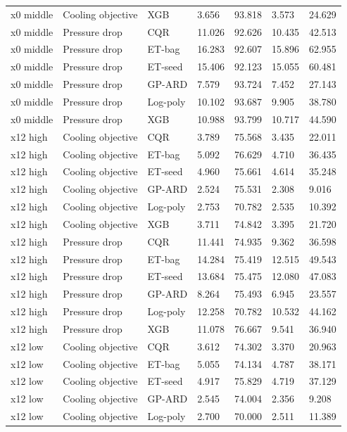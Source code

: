 \begin{longtable}{lllllll}
x0 middle & Cooling objective & XGB & 3.656 & 93.818 & 3.573 & 24.629\\
x0 middle & Pressure drop & CQR & 11.026 & 92.626 & 10.435 & 42.513\\
x0 middle & Pressure drop & ET-bag & 16.283 & 92.607 & 15.896 & 62.955\\
x0 middle & Pressure drop & ET-seed & 15.406 & 92.123 & 15.055 & 60.481\\
x0 middle & Pressure drop & GP-ARD & 7.579 & 93.724 & 7.452 & 27.143\\
x0 middle & Pressure drop & Log-poly & 10.102 & 93.687 & 9.905 & 38.780\\
x0 middle & Pressure drop & XGB & 10.988 & 93.799 & 10.717 & 44.590\\
x12 high & Cooling objective & CQR & 3.789 & 75.568 & 3.435 & 22.011\\
x12 high & Cooling objective & ET-bag & 5.092 & 76.629 & 4.710 & 36.435\\
x12 high & Cooling objective & ET-seed & 4.960 & 75.661 & 4.614 & 35.248\\
x12 high & Cooling objective & GP-ARD & 2.524 & 75.531 & 2.308 & 9.016\\
x12 high & Cooling objective & Log-poly & 2.753 & 70.782 & 2.535 & 10.392\\
x12 high & Cooling objective & XGB & 3.711 & 74.842 & 3.395 & 21.720\\
x12 high & Pressure drop & CQR & 11.441 & 74.935 & 9.362 & 36.598\\
x12 high & Pressure drop & ET-bag & 14.284 & 75.419 & 12.515 & 49.543\\
x12 high & Pressure drop & ET-seed & 13.684 & 75.475 & 12.080 & 47.083\\
x12 high & Pressure drop & GP-ARD & 8.264 & 75.493 & 6.945 & 23.557\\
x12 high & Pressure drop & Log-poly & 12.258 & 70.782 & 10.532 & 44.162\\
x12 high & Pressure drop & XGB & 11.078 & 76.667 & 9.541 & 36.940\\
x12 low & Cooling objective & CQR & 3.612 & 74.302 & 3.370 & 20.963\\
x12 low & Cooling objective & ET-bag & 5.055 & 74.134 & 4.787 & 38.171\\
x12 low & Cooling objective & ET-seed & 4.917 & 75.829 & 4.719 & 37.129\\
x12 low & Cooling objective & GP-ARD & 2.545 & 74.004 & 2.356 & 9.208\\
x12 low & Cooling objective & Log-poly & 2.700 & 70.000 & 2.511 & 11.389\\

\end{longtable}
